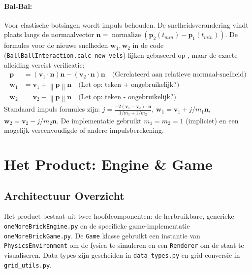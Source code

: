 \documentclass[11pt, a4paper]{article}
\newcommand{\vect}[1]{\mathbf{#1}}      %
\newcommand{\norm}[1]{\left\lVert#1\right\rVert} %
\begin{document}
\paragraph{Bal-Bal:} Voor elastische botsingen wordt impuls behouden. De snelheidsverandering vindt plaats langs de normaalvector $\vect{n} = \operatorname{normalize}(\vect{p}_2(t_{min}) - \vect{p}_1(t_{min}))$. De formules voor de nieuwe snelheden $\vect{w}_1, \vect{w}_2$ in de code (\texttt{BallBallInteraction.calc\_new\_vels}) lijken gebaseerd op \parencite{LeongCircleCircle}, maar de exacte afleiding vereist verificatie:
\begin{align*}
    \vect{p} &= (\vect{v}_1 \cdot \vect{n}) \vect{n} - (\vect{v}_2 \cdot \vect{n}) \vect{n} \quad \text{(Gerelateerd aan relatieve normaal-snelheid)} \\
    \vect{w}_1 &= \vect{v}_1 + \norm{\vect{p}} \vect{n} \quad \text{(Let op: teken + ongebruikelijk?)} \\
    \vect{w}_2 &= \vect{v}_2 - \norm{\vect{p}} \vect{n} \quad \text{(Let op: teken - ongebruikelijk?)}
\end{align*}
Standaard impuls formules \parencite{DesmosBallBall} zijn: $j = \frac{-2(\vect{v}_1 - \vect{v}_2)\cdot\vect{n}}{1/m_1 + 1/m_2}$, $\vect{w}_1 = \vect{v}_1 + j/m_1 \vect{n}$, $\vect{w}_2 = \vect{v}_2 - j/m_2 \vect{n}$. De implementatie gebruikt $m_1=m_2=1$ (impliciet) en een mogelijk vereenvoudigde of andere impulsberekening.

\newpage
\section{Het Product: Engine \& Game}
\label{sec:product}

\subsection{Architectuur Overzicht}
Het product bestaat uit twee hoofdcomponenten: de herbruikbare, generieke \texttt{oneMoreBrickEngine.py} en de specifieke game-implementatie \texttt{oneMoreBrickGame.py}. De \texttt{Game} klasse gebruikt een instantie van \texttt{PhysicsEnvironment} om de fysica te simuleren en een \texttt{Renderer} om de staat te visualiseren. Data types zijn gescheiden in \texttt{data\_types.py} en grid-conversie in \texttt{grid\_utils.py}.
\end{document}
